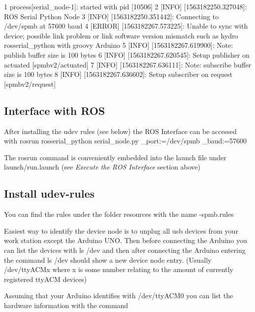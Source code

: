 \begin{DoxyCode}
1 process[serial\_node-1]: started with pid [10506]
2 [INFO] [1563182250.327048]: ROS Serial Python Node
3 [INFO] [1563182250.351442]: Connecting to /dev/spmb at 57600 baud
4 [ERROR] [1563182267.573225]: Unable to sync with device; possible link problem or link software version
       mismatch such as hydro rosserial\_python with groovy Arduino
5 [INFO] [1563182267.619900]: Note: publish buffer size is 100 bytes
6 [INFO] [1563182267.620545]: Setup publisher on actuated [spmbv2/actuated]
7 [INFO] [1563182267.636111]: Note: subscribe buffer size is 100 bytes
8 [INFO] [1563182267.636602]: Setup subscriber on request [spmbv2/request]
\end{DoxyCode}


\subsection*{Interface with R\+OS}


\begin{DoxyItemize}
\item After installing the udev rules (see below) the R\+OS Interface can be accessed with {\ttfamily rosrun rosserial\+\_\+python serial\+\_\+node.\+py \+\_\+port\+:=/dev/spmb \+\_\+baud\+:=57600}
\item The {\ttfamily rosrun} command is conveniently embedded into the launch file under {\ttfamily launch/run.\+launch} (see {\itshape Execute the R\+OS Interface} section above)
\end{DoxyItemize}

\subsection*{Install udev-\/rules}


\begin{DoxyItemize}
\item You can find the rules under the folder {\ttfamily resources} with the name {-\/spmb.\+rules}
\item Easiest way to identify the device node is to unplug all usb devices from your work station except the Arduino U\+NO. Then before connecting the Arduino you can list the devices with {\ttfamily ls /dev} and then after connecting the Arduino entering the command {\ttfamily ls /dev} should show a new device node entry. (Usually {\ttfamily /dev/tty\+A\+C\+Mx} where x is some number relating to the amount of currently registered tty\+A\+CM devices)
\item Assuming that your Arduino identifies with {\ttfamily /dev/tty\+A\+C\+M0} you can list the hardware information with the command
\end{DoxyItemize}


